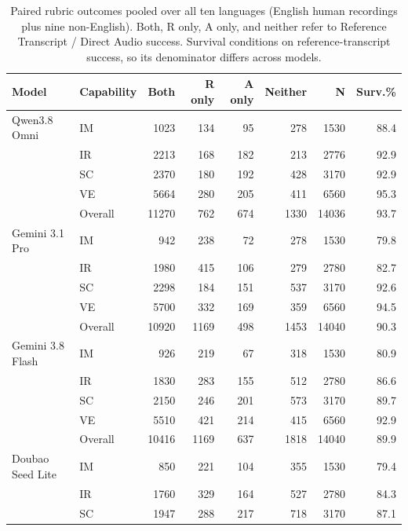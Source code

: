 \begin{table}[htbp]
\centering
\caption{Paired rubric outcomes pooled over all ten languages (English human recordings plus nine non-English). Both, R only, A only, and neither refer to Reference Transcript / Direct Audio success. Survival conditions on reference-transcript success, so its denominator differs across models.}
\label{tab:paired_counts}
\begingroup
\fontsize{8.5}{10.2}\selectfont
\setlength{\tabcolsep}{1pt}
\renewcommand{\arraystretch}{1.06}
\begin{tabular*}{\linewidth}{@{}l@{\hspace{6pt}}l@{\extracolsep{\fill}}rrrrrr@{}}
\toprule
\textbf{Model} & \textbf{Capability} & \textbf{Both} & \textbf{R only} & \textbf{A only} & \textbf{Neither} & \textbf{N} & \textbf{Surv.\%} \\
\midrule
Qwen3.8 Omni & IM & 1023 & 134 & 95 & 278 & 1530 & 88.4 \\
 & IR & 2213 & 168 & 182 & 213 & 2776 & 92.9 \\
 & SC & 2370 & 180 & 192 & 428 & 3170 & 92.9 \\
 & VE & 5664 & 280 & 205 & 411 & 6560 & 95.3 \\
 & Overall & 11270 & 762 & 674 & 1330 & 14036 & 93.7 \\
\addlinespace[3pt]
Gemini 3.1 Pro & IM & 942 & 238 & 72 & 278 & 1530 & 79.8 \\
 & IR & 1980 & 415 & 106 & 279 & 2780 & 82.7 \\
 & SC & 2298 & 184 & 151 & 537 & 3170 & 92.6 \\
 & VE & 5700 & 332 & 169 & 359 & 6560 & 94.5 \\
 & Overall & 10920 & 1169 & 498 & 1453 & 14040 & 90.3 \\
\addlinespace[3pt]
Gemini 3.8 Flash & IM & 926 & 219 & 67 & 318 & 1530 & 80.9 \\
 & IR & 1830 & 283 & 155 & 512 & 2780 & 86.6 \\
 & SC & 2150 & 246 & 201 & 573 & 3170 & 89.7 \\
 & VE & 5510 & 421 & 214 & 415 & 6560 & 92.9 \\
 & Overall & 10416 & 1169 & 637 & 1818 & 14040 & 89.9 \\
\addlinespace[3pt]
Doubao Seed Lite & IM & 850 & 221 & 104 & 355 & 1530 & 79.4 \\
 & IR & 1760 & 329 & 164 & 527 & 2780 & 84.3 \\
 & SC & 1947 & 288 & 217 & 718 & 3170 & 87.1 \\

\end{tabular*}
\end{table}
